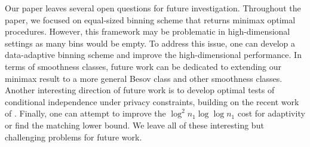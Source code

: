 \documentclass[twoside,11pt]{article}
\begin{document}
Our paper leaves several open questions for future investigation. Throughout the paper, we focused on equal-sized binning scheme that returns minimax optimal procedures. However, this framework may be problematic in high-dimensional settings as many bins would be empty. To address this issue, one can develop a data-adaptive binning scheme and improve the high-dimensional performance. In terms of smoothness classes, future work can be dedicated to extending our minimax result to a more general Besov class and other smoothness classes. Another interesting direction of future work is to develop optimal tests of conditional independence under privacy constraints, building on the recent work of \cite{neykov2021minimax,kim2022local}. Finally, one can attempt to improve the $\log^2 n_1 \log \log n_1$ cost for adaptivity or find the matching lower bound. We leave all of these interesting but challenging problems for future work.




\newpage
\end{document}
